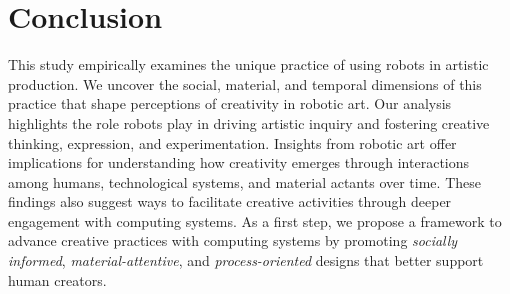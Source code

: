 \section{Conclusion}

This study empirically examines the unique practice of using robots in artistic production. We uncover the social, material, and temporal dimensions of this practice that shape perceptions of creativity in robotic art. Our analysis highlights the role robots play in driving artistic inquiry and fostering creative thinking, expression, and experimentation. Insights from robotic art offer implications for understanding how creativity emerges through interactions among humans, technological systems, and material actants over time. These findings also suggest ways to facilitate creative activities through deeper engagement with computing systems. As a first step, we propose a framework to advance creative practices with computing systems by promoting \textit{socially informed}, \textit{material-attentive}, and \textit{process-oriented} designs that better support human creators.

